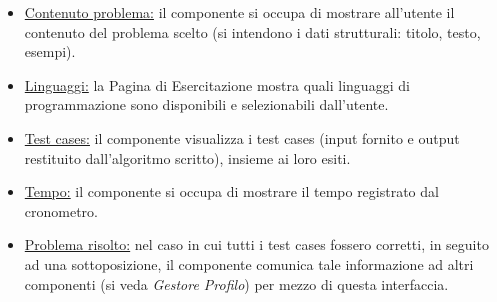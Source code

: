 \documentclass[11pt, a4paper]{article}
\theoremstyle{definition} %
\begin{document}
\begin{description}
\begin{itemize}
        \item \underline{Contenuto problema:} il componente si occupa di mostrare
        all'utente il contenuto del problema scelto (si intendono i dati strutturali:
        titolo, testo, esempi).

        \item \underline{Linguaggi:} la Pagina di Esercitazione mostra quali
        linguaggi di programmazione sono disponibili e selezionabili dall'utente.

        \item \underline{Test cases:} il componente visualizza i test cases
        (input fornito e output restituito dall'algoritmo scritto), insieme ai
        loro esiti.

        \item \underline{Tempo:} il componente si occupa di mostrare il tempo
        registrato dal cronometro.

        \item \underline{Problema risolto:} nel caso in cui tutti i test cases
        fossero corretti, in seguito ad una sottoposizione, il componente comunica
        tale informazione ad altri componenti (si veda \textit{Gestore Profilo}) per
        mezzo di questa interfaccia.
    \end{itemize}
\end{description}
\end{document}
